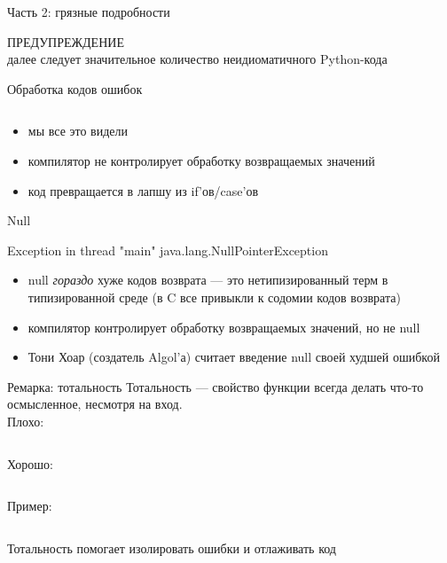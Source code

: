\documentclass[10pt]{beamer}
\newcommand{\code}[4]{\inputminted[linenos, frame=none, firstline=#2, lastline=#3,
  framesep=10pt, bgcolor=lightgray]{#4}{#1}}
\begin{document}
\begin{frame}{}
  \begin{center}
    \huge Часть 2: грязные подробности
  \end{center}
\end{frame}

\begin{frame}{}
  \begin{center}
    \large ПРЕДУПРЕЖДЕНИЕ\\
    далее следует значительное количество неидиоматичного Python-кода
  \end{center}
\end{frame}

\begin{frame}{Обработка кодов ошибок}
  \code{code.c}{1}{10}{c}
  \begin{itemize}
  \item мы все это видели
  \item компилятор не контролирует обработку возвращаемых значений
  \item код превращается в лапшу из if'ов/case'ов
  \end{itemize}
\end{frame}

\begin{frame}{Null}
  \begin{block}{}
    Exception in thread "main" java.lang.NullPointerException
  \end{block}
  \begin{itemize}
  \item null \emph{гораздо} хуже кодов возврата — это нетипизированный терм в типизированной среде (в C все привыкли к содомии кодов возврата)
  \item компилятор контролирует обработку возвращаемых значений, но не null
  \item Тони Хоар (создатель Algol'а) считает введение null своей худшей ошибкой
  \end{itemize}
\end{frame}

\begin{frame}{Ремарка: тотальность}
  Тотальность — свойство функции всегда делать что-то осмысленное, несмотря на вход.\\
  Плохо:
  \code{code.py}{21}{22}{python}
  Хорошо:
  \code{code.py}{24}{26}{python}
  Пример:
  \code{code.py}{112}{118}{python}
  Тотальность помогает изолировать ошибки и отлаживать код
\end{frame}
\end{document}
